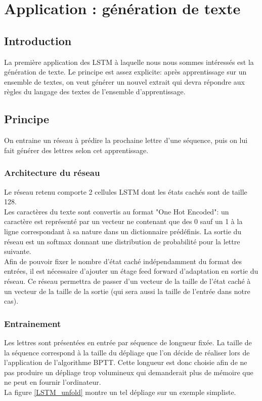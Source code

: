 \chapter{Application : génération de texte}

\section{Introduction}

La première application des LSTM à laquelle nous nous sommes intéressés est la génération de texte. Le principe est assez explicite: après apprentissage sur un ensemble de textes, on veut générer un nouvel extrait qui devra répondre aux règles du langage des textes de l'ensemble d'apprentissage.
 

\section{Principe}
On entraine un réseau à prédire la prochaine lettre d'une séquence, puis on lui fait générer des lettres selon cet apprentissage.

\subsection{Architecture du réseau}

Le réseau retenu comporte 2 cellules LSTM dont les états cachés sont de taille 128.
\\ Les caractères du texte sont convertis au format "One Hot Encoded": un caractère est représenté par un vecteur ne contenant que des 0 sauf un 1 à la ligne correspondant à sa nature dans un dictionnaire prédéfinis. La sortie du réseau est un softmax donnant une distribution de probabilité pour la lettre suivante.
\\ Afin de pouvoir fixer le nombre d'état caché indépendamment du format des entrées, il est nécessaire d'ajouter un étage feed forward d'adaptation en sortie du réseau. Ce réseau permettra de passer d'un vecteur de la taille de l'état caché à un vecteur de la taille de la sortie (qui sera aussi la taille de l'entrée dans notre cas).

\subsection{Entrainement}

Les lettres sont présentées en entrée par séquence de longueur fixée. La taille de la séquence correspond à la taille du dépliage que l'on décide de réaliser lors de l'application de l'algorithme BPTT. Cette longueur est donc choisie afin de ne pas produire un dépliage trop volumineux qui demanderait plus de mémoire que ne peut en fournir l'ordinateur.
\\ La figure \ref{LSTM_unfold} montre un tel dépliage sur un exemple simpliste.

